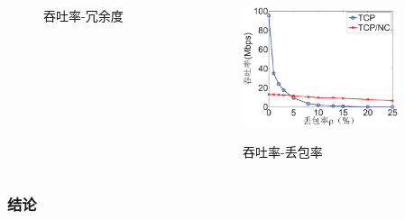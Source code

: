 \begin{frame}[allowframebreaks]
\begin{columns}
\begin{column}{0.5\textwidth}
\begin{figure}
				\label{fig:throughput2redundancy}
				\caption{吞吐率-冗余度}
			\end{figure}
		\end{column}
		\begin{column}{0.5\textwidth}
			\begin{figure}
				\includegraphics[height=3.5cm]{../figures/throughput2lossrate.eps}
				\label{fig:throughput2loss}
				\caption{吞吐率-丢包率}
			\end{figure}
		\end{column}
	\end{columns}
\end{frame}

\begin{frame}
	\frametitle{结论}
\end{frame}















